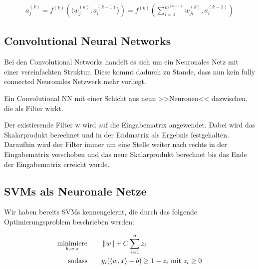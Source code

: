 \begin{align*}
a_j^{(k)} = f^{(k)} (\langle w_{j}^{(k)}, a_i^{(k-1)}\rangle) = f^{(k)} (\sum_{i=1}^{m^{(k-1)}} w_{ji}^{(k)},a_i^{(k-1)} )
\end{align*}

\subsection{Convolutional Neural Networks}

\begin{dsafigure}
	\begin{center}
		\caption{Ein Convolutional Neural Network (CNN) (dt.: >>faltendes neurales Netzwerk<<) %
		}
		\label{FigConvNN}
	\end{center}
\end{dsafigure}


Bei den Convolutional Networks handelt es sich um ein Neuronales Netz mit einer vereinfachten Struktur. Diese kommt dadurch zu Stande, dass nun kein fully connected Neuronales Netzwerk mehr vorliegt. 

\begin{dsafigure}
	\begin{center}
		\caption{Ein Convolutional NN mit einer Schicht aus neun >>Neuronen<< dazwischen, die als Filter wirkt. }
		\label{FigConvNN}
	\end{center}
\end{dsafigure}

Der existierende Filter {w} wird auf die Eingabematrix angewendet. Dabei wird das Skalarprodukt berechnet und in der Endmatrix als Ergebnis festgehalten. Daraufhin wird der Filter immer um eine Stelle weiter nach rechts in der Eingabematrix verschoben und das neue Skalarprodukt berechnet bis das Ende der Eingabematrix erreicht wurde.

\subsection{SVMs als Neuronale Netze}

Wir haben bereits SVMs kennengelernt, die durch das folgende Optimierungsproblem beschrieben werden:

\begin{align*}
\underset{b,w,z}{\text{minimiere}} &\qquad\left\lVert w\right\rVert + C  \sum_{i=1}^{n} z_i\\
\text{sodass} &\qquad y_i (\langle w,x \rangle - b) \geq 1 - z_i \text { mit } z_i \geq 0
\end{align*}

